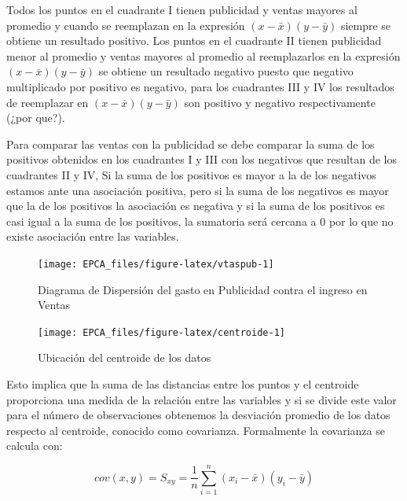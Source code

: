 \documentclass[
]{krantz}
\begin{document}
Todos los puntos en el cuadrante I tienen publicidad y ventas mayores al promedio y cuando se reemplazan en la expresión \(\left(x-\bar{x}\right)\left(y-\bar{y}\right)\) siempre se obtiene un resultado positivo. Los puntos en el cuadrante II tienen publicidad menor al promedio y ventas mayores al promedio al reemplazarlos en la expresión \(\left(x-\bar{x}\right)\left(y-\bar{y}\right)\) se obtiene un resultado negativo puesto que negativo multiplicado por positivo es negativo, para los cuadrantes III y IV los resultados de reemplazar en \(\left(x-\bar{x}\right)\left(y-\bar{y}\right)\) son positivo y negativo respectivamente (¿por que?).

Para comparar las ventas con la publicidad se debe comparar la suma de los positivos obtenidos en los cuadrantes I y III con los negativos que resultan de los cuadrantes II y IV, Si la suma de los positivos es mayor a la de los negativos estamos ante una asociación positiva, pero si la suma de los negativos es mayor que la de los positivos la asociación es negativa y si la suma de los positivos es casi igual a la suma de los positivos, la sumatoria será cercana a \(0\) por lo que no existe asociación entre las variables.

\begin{figure}[!h]

{\centering \texttt{[image: EPCA\_files/figure-latex/vtaspub-1]} 

}

\caption{Diagrama de Dispersión del gasto en Publicidad contra el ingreso en Ventas}\label{fig:vtaspub}
\end{figure}

\begin{figure}[!h]

{\centering \texttt{[image: EPCA\_files/figure-latex/centroide-1]} 

}

\caption{Ubicación del centroide de los datos}\label{fig:centroide}
\end{figure}

Esto implica que la suma de las distancias entre los puntos y el centroide proporciona una medida de la relación entre las variables y si se divide este valor para el número de observaciones obtenemos la desviación promedio de los datos respecto al centroide, conocido como covarianza. Formalmente la covarianza se calcula con:

\begin{equation} 
  cov(x,y) = S_{xy} = \dfrac{1}{n} \sum_{i=1}^{n}\left(x_i-\bar{x}\right)\left(y_i-\bar{y}\right)
  \label{eq:covar}
\end{equation}
\end{document}
